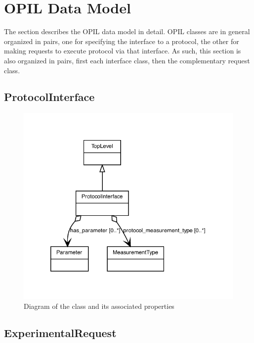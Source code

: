 
\section{OPIL Data Model}\label{sec:model}

The section describes the OPIL data model in detail.  
OPIL classes are in general organized in pairs, one for specifying the interface to a protocol, the other for making requests to execute protocol via that interface.
As such, this section is also organized in pairs, first each interface class, then the complementary request class.



\subsection{ProtocolInterface}
\label{sec:ProtocolInterface}

\begin{figure}[ht]
\begin{center}
\includegraphics[scale=0.8]{figures/ProtocolInterface}
\caption[]{Diagram of the  class and its associated properties}
\label{uml:ProtocolInterface}
\end{center}
\end{figure}


\subsection{ExperimentalRequest}
\label{sec:ExperimentalRequest}


